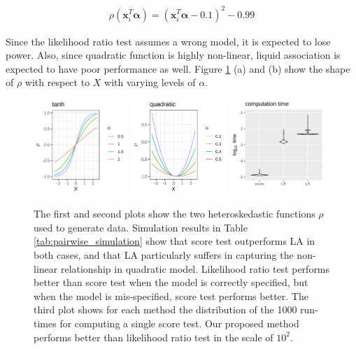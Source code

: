 \documentclass[aap,authoryear, preprint]{imsart}
\numberwithin{equation}{section}
\theoremstyle{plain}
\begin{document}
\begin{align}
    \rho(\bm{x}_i^T\bm{\alpha}) = (\bm{x}_i^T\bm{\alpha} - 0.1)^2 - 0.99
    \label{eq:data_generating2_quadratic}
\end{align}

Since the likelihood ratio test assumes a wrong model, it is expected to lose power. Also, since quadratic function is highly non-linear, liquid association is expected to have poor performance as well. Figure \ref{fig:sim} (a) and (b) show the shape of $\rho$ with respect to $X$ with varying levels of $\alpha$. \\
\begin{figure}
         \includegraphics[width=0.32\textwidth]{figures/tanh.png}
         \includegraphics[width=0.32\textwidth]{figures/quadratic.png}
         \includegraphics[width=0.32\textwidth]{figures/comptime.png}
        \caption{The first and second plots show the two heteroskedastic functions $\rho$ used to generate data. Simulation results in Table \ref{tab:pairwise_simulation} show that score test outperforms LA in both cases, and that LA particularly suffers in capturing the non-linear relationship in quadratic model. Likelihood ratio test performs better than score test when the model is correctly specified, but when the model is mis-specified, score test performs better. The third plot shows for each method the distribution of the 1000 run-times for computing a single score test. Our proposed method performs better than likelihood ratio test in the scale of $10^2$.}
        \label{fig:sim}
\end{figure}
\end{document}
